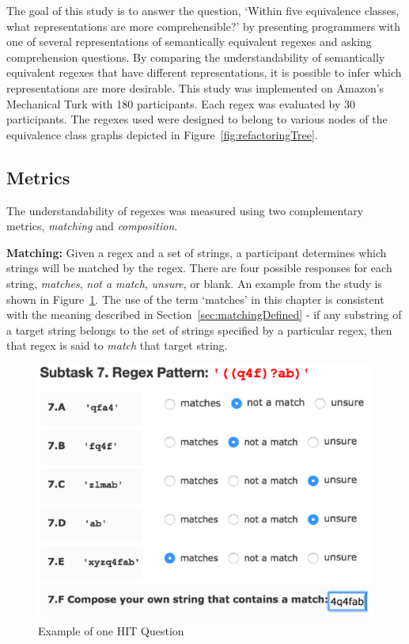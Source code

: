 
The goal of this study is to answer the question, `Within five equivalence classes, what representations are more comprehensible?' by presenting programmers with one of several representations of semantically equivalent regexes and asking comprehension questions. By comparing the understandability of semantically equivalent regexes that have different representations, it is possible to infer which representations are more desirable.
This study was implemented on Amazon's Mechanical Turk with 180 participants.  Each regex was evaluated by 30 participants.
The regexes used were designed to belong to various nodes of the equivalence class graphs depicted in Figure~\ref{fig:refactoringTree}.



\subsection{Metrics}
\label{sec:understandabilityMetrics}
The understandability of regexes was measured using two complementary metrics, \emph{matching} and \emph{composition}.

\textbf{Matching:}
Given a regex and a set of strings, a participant determines which strings will be matched by the regex. There are four possible responses for each string, \emph{matches}, \emph{not a match}, \emph{unsure}, or blank. An example from the study is shown in Figure~\ref{fig:exampleQuestion}.  The use of the term `matches' in this chapter is consistent with the meaning described in Section~\ref{sec:matchingDefined} - if any substring of a target string belongs to the set of strings specified by a particular regex, then that regex is said to \emph{match} that target string.


\begin{figure}[tb]
\centering
\includegraphics[width=0.54\columnwidth]{nontex/illustrations/exampleQuestion.eps}
\vspace{-12pt}
\caption{Example of one HIT Question}
\vspace{-6pt}
\label{fig:exampleQuestion}
\end{figure}

